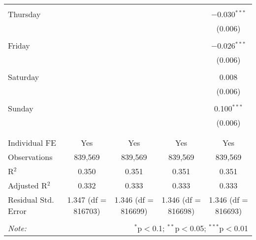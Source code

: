 \documentclass[
]{article}
\begin{document}
\begin{table}[!htbp]
{\begin{tabular}{@{\extracolsep{5pt}}lcccc}
  & & & & \\ 
 Thursday &  &  &  & $-$0.030$^{***}$ \\ 
  &  &  &  & (0.006) \\ 
  & & & & \\ 
 Friday &  &  &  & $-$0.026$^{***}$ \\ 
  &  &  &  & (0.006) \\ 
  & & & & \\ 
 Saturday &  &  &  & 0.008 \\ 
  &  &  &  & (0.006) \\ 
  & & & & \\ 
 Sunday &  &  &  & 0.100$^{***}$ \\ 
  &  &  &  & (0.006) \\ 
  & & & & \\ 
\hline \\[-1.8ex] 
Individual FE & Yes & Yes & Yes & Yes \\ 
Observations & 839,569 & 839,569 & 839,569 & 839,569 \\ 
R$^{2}$ & 0.350 & 0.351 & 0.351 & 0.351 \\ 
Adjusted R$^{2}$ & 0.332 & 0.333 & 0.333 & 0.333 \\ 
Residual Std. Error & 1.347 (df = 816703) & 1.346 (df = 816699) & 1.346 (df = 816698) & 1.346 (df = 816693) \\ 
\hline 
\hline \\[-1.8ex] 
\textit{Note:}  & \multicolumn{4}{r}{$^{*}$p$<$0.1; $^{**}$p$<$0.05; $^{***}$p$<$0.01} \\ 
\end{tabular}
} 
\end{table} 
\newpage
\end{document}
